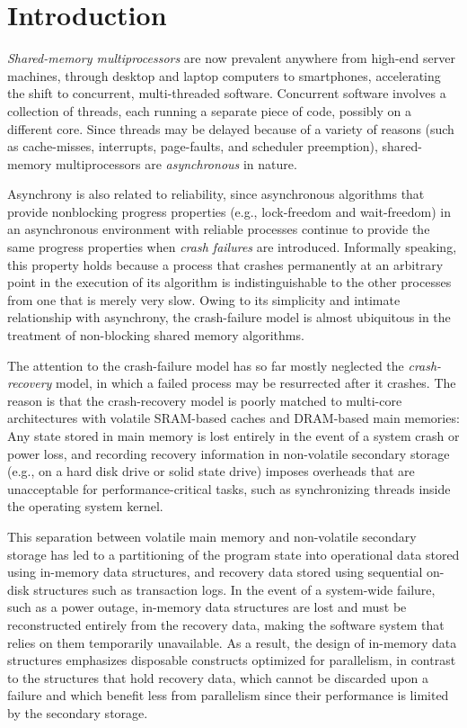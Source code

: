 
\section{Introduction}

\emph{Shared-memory multiprocessors} are now prevalent anywhere from
high-end server machines, through desktop and laptop computers to smartphones,
accelerating the shift to concurrent, multi-threaded software.
Concurrent software involves a collection of threads,
each running a separate piece of code,
possibly on a different core.
Since threads may be delayed because of a variety of reasons
(such as cache-misses, interrupts, page-faults, and scheduler preemption),
shared-memory multiprocessors are \emph{asynchronous} in nature.

Asynchrony is also related to reliability, since asynchronous algorithms
that provide nonblocking progress properties (e.g., lock-freedom and wait-freedom)
in an asynchronous environment with reliable processes continue to provide
the same progress properties when \emph{crash failures} are introduced.
Informally speaking, this property holds because a process that crashes
permanently at an arbitrary point in the execution of its algorithm
is indistinguishable to the other processes from one that is merely very slow.
Owing to its simplicity and intimate relationship with asynchrony, the crash-failure
model is almost ubiquitous in the treatment of non-blocking shared memory algorithms.

The attention to the crash-failure model has so far mostly neglected the \emph{crash-recovery} model,
in which a failed process may be resurrected after it crashes.
The reason is that the crash-recovery model is poorly matched to multi-core
architectures with volatile SRAM-based caches and DRAM-based main memories:
Any state stored in main memory is lost entirely in the event of a system crash
or power loss, and recording recovery information in non-volatile secondary storage
(e.g., on a hard disk drive or solid state drive)
imposes overheads that are unacceptable for performance-critical tasks,
such as synchronizing threads inside the operating system kernel.

This separation between volatile main memory and non-volatile secondary storage
has led to a partitioning of the program state into operational data stored using in-memory data structures,
and recovery data stored using sequential on-disk structures such as transaction logs.
In the event of a system-wide failure, such as a power outage, in-memory data structures are
lost and must be reconstructed entirely from the recovery data, making the software system
that relies on them temporarily unavailable.
As a result, the design of in-memory data structures emphasizes disposable
constructs optimized for parallelism,
in contrast to the structures that hold recovery data, which cannot be discarded upon a failure
and which benefit less from parallelism since their performance is limited by the secondary storage.

